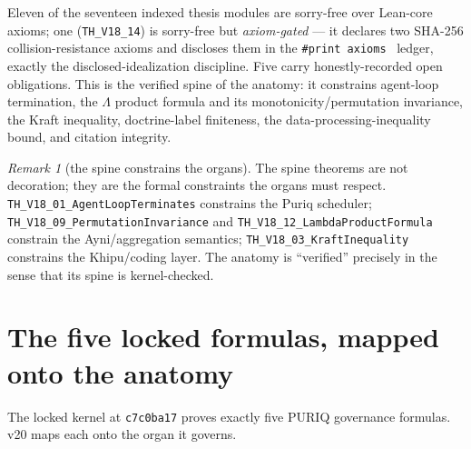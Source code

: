 \documentclass[11pt]{article}
\theoremstyle{plain}
\theoremstyle{definition}
\theoremstyle{remark}
\newtheorem{remark}[theorem]{Remark}
\newcommand{\La}{\Lambda}
\newcommand{\printax}[1]{\texttt{\#print axioms}~\texttt{#1}}
\begin{document}
Eleven of the seventeen indexed thesis modules are sorry-free over Lean-core axioms; one
(\texttt{TH\_V18\_14}) is sorry-free but \emph{axiom-gated} --- it declares two SHA-256
collision-resistance axioms and discloses them in the \printax{} ledger, exactly the
disclosed-idealization discipline. Five carry honestly-recorded open obligations. This
is the verified spine of the anatomy: it constrains agent-loop termination, the $\La$
product formula and its monotonicity/permutation invariance, the Kraft inequality,
doctrine-label finiteness, the data-processing-inequality bound, and citation integrity.

\begin{remark}[the spine constrains the organs]
The spine theorems are not decoration; they are the formal constraints the organs must
respect. \texttt{TH\_V18\_01\_AgentLoopTerminates} constrains the Puriq scheduler;
\texttt{TH\_V18\_09\_PermutationInvariance} and \texttt{TH\_V18\_12\_LambdaProductFormula}
constrain the Ayni/aggregation semantics; \texttt{TH\_V18\_03\_KraftInequality}~\cite{shannon1948}
constrains the Khipu/coding layer. The anatomy is ``verified'' precisely in the sense
that its spine is kernel-checked.
\end{remark}

\section{The five locked formulas, mapped onto the anatomy}
\label{sec:locked}

The locked kernel at \texttt{c7c0ba17} proves exactly five PURIQ governance formulas.
v20 maps each onto the organ it governs.
\end{document}
